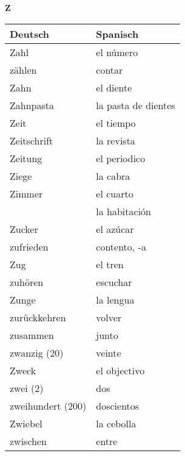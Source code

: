 \begin{flushright}\begin{Huge}\textbf{Z}\end{Huge}\end{flushright}

\begin{longtable}{p{} p{}} 
\textbf{Deutsch}     & \textbf{Spanisch}                                       \\ \hline
\hline
\endhead %
Zahl & el número \\
zählen & contar\\
Zahn & el diente\\
Zahnpasta & la pasta de dientes\\
Zeit & el tiempo\\
Zeitschrift & la revista\\
Zeitung & el periodico \\
Ziege & la cabra\\
Zimmer & el cuarto\\
~ & la habitación\\
Zucker & el azúcar\\
zufrieden & contento, -a\\
Zug & el tren\\
zuhören & escuchar\\
Zunge & la lengua\\
zurückkehren & volver\\
zusammen & junto\\
zwanzig (20) & veinte\\
Zweck & el objectivo\\
zwei (2) & dos\\
zweihundert (200) & doscientos\\
Zwiebel & la cebolla\\
zwischen & entre\\

\end{longtable}
